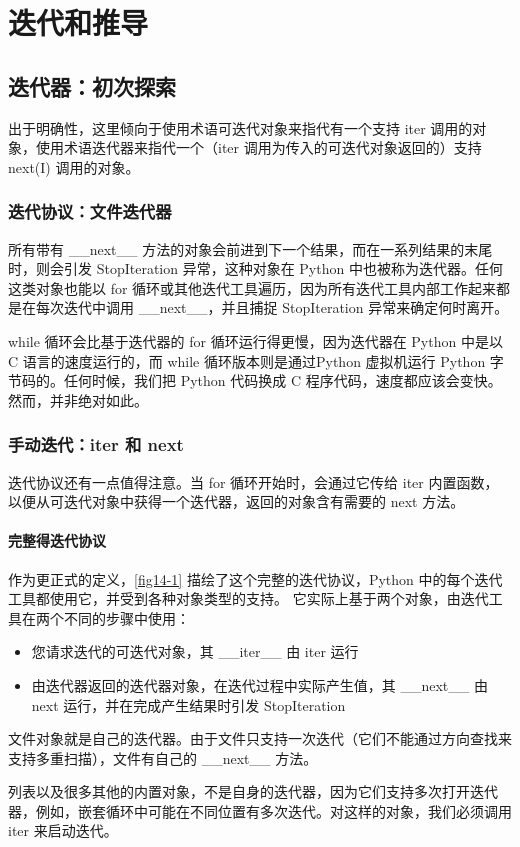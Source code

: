 \chapter{迭代和推导}
\section{迭代器：初次探索}
出于明确性，这里倾向于使用术语可迭代对象来指代有一个支持 iter 调用的对象，使用术语迭代器来指代一个（iter 调用为传入的可迭代对象返回的）支持 next(I) 调用的对象。
\subsection{迭代协议：文件迭代器}
所有带有 \_\_next\_\_ 方法的对象会前进到下一个结果，而在一系列结果的末尾时，则会引发 StopIteration 异常，这种对象在 Python 中也被称为迭代器。任何这类对象也能以 for 循环或其他迭代工具遍历，因为所有迭代工具内部工作起来都是在每次迭代中调用 \_\_next\_\_，并且捕捉 StopIteration 异常来确定何时离开。

while 循环会比基于迭代器的 for 循环运行得更慢，因为迭代器在 Python 中是以 C 语言的速度运行的，而 while 循环版本则是通过Python 虚拟机运行 Python 字节码的。任何时候，我们把 Python 代码换成 C 程序代码，速度都应该会变快。然而，并非绝对如此。
\subsection{手动迭代：iter 和 next}
迭代协议还有一点值得注意。当 for 循环开始时，会通过它传给 iter 内置函数，以便从可迭代对象中获得一个迭代器，返回的对象含有需要的 next 方法。
\subsubsection{完整得迭代协议}
作为更正式的定义，\autoref{fig14-1} 描绘了这个完整的迭代协议，Python 中的每个迭代工具都使用它，并受到各种对象类型的支持。 它实际上基于两个对象，由迭代工具在两个不同的步骤中使用：
\begin{itemize}
    \item 您请求迭代的可迭代对象，其 \_\_iter\_\_ 由 iter 运行
    \item  由迭代器返回的迭代器对象，在迭代过程中实际产生值，其 \_\_next\_\_ 由 next 运行，并在完成产生结果时引发 StopIteration
\end{itemize}

文件对象就是自己的迭代器。由于文件只支持一次迭代（它们不能通过方向查找来支持多重扫描），文件有自己的 __next__ 方法。

列表以及很多其他的内置对象，不是自身的迭代器，因为它们支持多次打开迭代器，例如，嵌套循环中可能在不同位置有多次迭代。对这样的对象，我们必须调用 iter 来启动迭代。